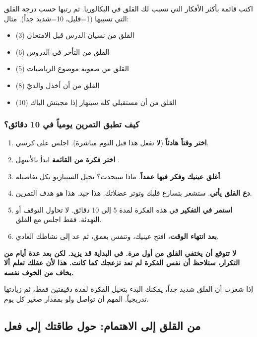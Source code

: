 \documentclass[12pt,a4paper]{book}
\newcommand{\importantAr}[1]{%
	\begin{important}
		\bfseries #1
	\end{important}
}
\begin{document}
	اكتب قائمة بأكثر الأفكار التي تسبب لك القلق في البكالوريا. ثم رتبها حسب درجة القلق التي تسببها (1=قليل، 10=شديد جداً). مثال:
	
	\begin{itemize}
		\item القلق من نسيان الدرس قبل الامتحان (3)
		\item القلق من التأخر في الدروس (6)
		\item القلق من صعوبة موضوع الرياضيات (5)
		\item القلق من أن أخذل والديّ (8)
		\item القلق من أن مستقبلي كله سينهار إذا مجبتش الباك (10)
	\end{itemize}
	
	\subsubsection{كيف تطبق التمرين يومياً في 10 دقائق؟}
	\label{subsec:exposure-steps}
	
	\begin{enumerate}
		\item \textbf{اختر وقتاً هادئاً} (لا تفعل هذا قبل النوم مباشرة). اجلس على كرسي.
		\item \textbf{اختر فكرة من القائمة} ابدأ بالأسهل .
		\item \textbf{أغلق عينيك وفكر فيها عمداً}. ماذا سيحدث؟ تخيل السيناريو بكل تفاصيله.
		\item \textbf{دع القلق يأتي}. ستشعر بتسارع قلبك وتوتر عضلاتك. هذا جيد. هذا هو هدف التمرين.
		\item \textbf{استمر في التفكير} في هذه الفكرة لمدة 5 إلى 10 دقائق. لا تحاول التوقف أو التهدئة. فقط اجلس مع القلق.
		\item \textbf{بعد انتهاء الوقت}، افتح عينيك، وتنفس بعمق، ثم عد إلى نشاطك العادي.
	\end{enumerate}
	
	\importantAr{لا تتوقع أن يختفي القلق من أول مرة. في البداية قد يزيد. لكن بعد عدة أيام من التكرار، ستلاحظ أن نفس الفكرة لم تعد تزعجك كما كانت. هذا لأن عقلك تعلم ألا يخاف من الخوف نفسه.}
	
	إذا شعرت أن القلق شديد جداً، يمكنك البدء بتخيل الفكرة لمدة دقيقتين فقط، ثم زيادتها تدريجياً. المهم أن تواصل ولو بمقدار صغير كل يوم.
	
	\subsection{من القلق إلى الاهتمام: حول طاقتك إلى فعل}
	\label{sec:caring-to-action}
	
\end{document}
